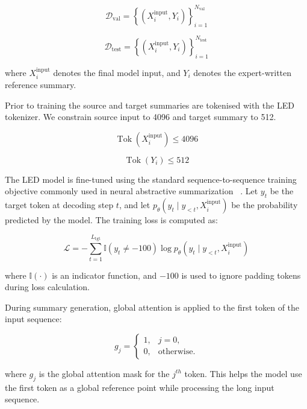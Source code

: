 \documentclass[11pt, a4paper]{article}
\theoremstyle{plain}%
\theoremstyle{remark}%
\theoremstyle{definition}%
\begin{document}
\begin{equation}
\mathcal{D}_{\text{val}} =
\left\{ \left(X_i^{\text{input}}, Y_i\right) \right\}_{i=1}^{N_{\text{val}}}
\end{equation}

\begin{equation}
\mathcal{D}_{\text{test}} =
\left\{ \left(X_i^{\text{input}}, Y_i\right) \right\}_{i=1}^{N_{\text{test}}}
\end{equation}

where \(X_i^{\text{input}}\) denotes the final model input, and \(Y_i\) denotes the expert-written reference summary.

Prior to training the source and target summaries are tokenised with the LED tokenizer. We constrain source input to 4096 and target summary to 512.

\begin{equation}
\operatorname{Tok}\left(X_i^{\text{input}}\right) \leq 4096
\end{equation}

\begin{equation}
\operatorname{Tok}(Y_i) \leq 512
\end{equation}

The LED model is fine-tuned using the standard sequence-to-sequence training objective commonly used in neural abstractive summarization ~\cite{b7,b8,b9,b10}. Let \(y_t\) be the target token at decoding step \(t\), and let \(p_{\theta}(y_t \mid y_{<t}, X_i^{\text{input}})\) be the probability predicted by the model. The training loss is computed as:

\begin{equation}
\mathcal{L}
=
-\sum_{t=1}^{L_{\text{tgt}}}
\mathbb{I}(y_t \neq -100)
\log p_{\theta}\left(y_t \mid y_{<t}, X_i^{\text{input}}\right)
\end{equation}

where \(\mathbb{I}(\cdot)\) is an indicator function, and \(-100\) is used to ignore padding tokens during loss calculation.

During summary generation, global attention is applied to the first token of the input sequence:

\begin{equation}
g_j =
\begin{cases}
1, & j = 0, \\
0, & \text{otherwise}.
\end{cases}
\end{equation}

where \(g_j\) is the global attention mask for the \(j^{th}\) token. This helps the model use the first token as a global reference point while processing the long input sequence.
\end{document}
